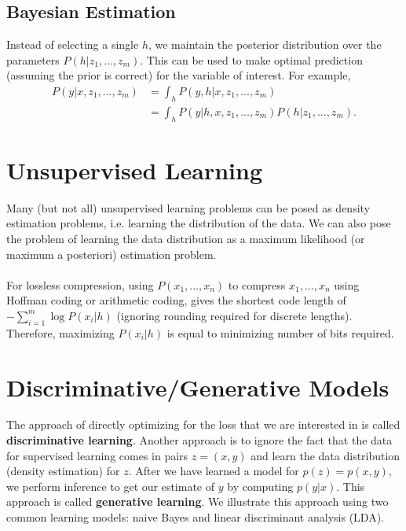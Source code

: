 \documentclass{article}
\begin{document}
    \subsection{Bayesian Estimation}
    Instead of selecting a single $h$, we maintain the posterior distribution over the parameters $P(h|z_1,...,z_m)$. This can be used to make optimal prediction (assuming the prior is correct) for the variable of interest. For example, 
    \begin{align}
    P(y|x,z_1,...,z_m) &= \int_h P(y,h|x,z_1,...,z_m) \\
    				   &= \int_h P(y|h,x,z_1,...,z_m) P(h|z_1,...,z_m).
    \end{align}
    
    
    \section{Unsupervised Learning}
    Many (but not all) unsupervised learning problems can be posed as density estimation problems, i.e. learning the distribution of the data. We can also pose the problem of learning the data distribution as a maximum likelihood (or maximum a posteriori) estimation problem. 
    \\\\
    For lossless compression, using $P(x_1,...,x_n)$ to compress $x_1,...,x_n$ using Hoffman coding or arithmetic coding, gives the  shortest code length of $-\sum_{i=1}^m \log P(x_i|h)$ (ignoring rounding required for discrete lengths). Therefore, maximizing $P(x_i|h)$ is equal to minimizing number of bits required.
    
    \section{Discriminative/Generative Models}
    The approach of directly optimizing for the loss that we are interested in is called \textbf{discriminative learning}. Another approach is to ignore the fact that the data for supervised learning comes in pairs $z=(x,y)$ and learn the data distribution (density estimation) for $z$. After we have learned a model for $p(z) = p(x,y)$, we perform inference to get our estimate of $y$ by computing $p(y|x)$. This approach is called \textbf{generative learning}. We illustrate this approach using two common learning models: naive Bayes and linear discriminant analysis (LDA).
    
\end{document}
